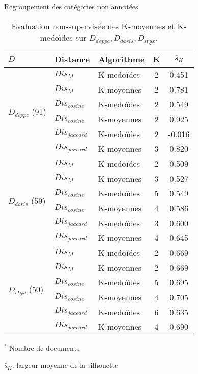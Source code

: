 \begin{frame}[c]{Regroupement des catégories non annotées}
	\newlength{\mrcell}
	\setlength{\mrcell}{0.8cm}
	\begin{table}[!htb]
		\tiny
		\begin{center}						
				\begin{tabular}[pos]{|l|l|l|c|c|}
					\hline
					${D}$& {Distance} & {Algorithme}& {K}  & $\bar{s}_K$ \\ \hline
					\multirow{6}{\mrcell}{${D}_{dcppc}$ (91)} & $Dis_{M}$ & K-medoïdes & 2 & 0.451  \\ \cline{2-5}
					& $Dis_{M}$  & K-moyennes & 2 & 0.781  \\ \cline{2-5}
					& $Dis_{cosine}$ & K-medoïdes & 2 & 0.549 \\ \cline{2-5}
					& $Dis_{cosine}$ & K-moyennes & 2 & 0.925 \\ \cline{2-5}
					& $Dis_{jaccard}$ & K-medoïdes & 2 & -0.016  \\ \cline{2-5}
					& $Dis_{jaccard}$ & K-moyennes & 3 & 0.820 \\ \hline
					\multirow{6}{\mrcell}{${D}_{doris}$ (59)}  & $Dis_{M}$ & K-medoïdes & 2 & 0.509  \\ \cline{2-5}
					& $Dis_{M}$ & K-moyennes & 3 & 0.527  \\ \cline{2-5}
					& $Dis_{cosine}$ & K-medoïdes & 5 & 0.549 \\ \cline{2-5}
					& $Dis_{cosine}$ & K-moyennes & 4 & 0.586 \\ \cline{2-5}
					& $Dis_{jaccard}$ & K-medoïdes & 3 & 0.600 \\ \cline{2-5}
					& $Dis_{jaccard}$ & K-moyennes & 4 & 0.645 
					\\ \hline
					\multirow{6}{\mrcell}{${D}_{styx}$ (50)}  & $Dis_{M}$ & K-medoïdes & 2 & 0.669 \\ \cline{2-5}
					& $Dis_{M}$ & K-moyennes & 2 & 0.669 \\ \cline{2-5}
					& $Dis_{cosine}$ & K-medoïdes & 5 & 0.695 \\ \cline{2-5}
					& $Dis_{cosine}$ & K-moyennes & 4 & 0.705 \\ \cline{2-5}
					& $Dis_{jaccard}$ & K-medoïdes & 6 & 0.635 \\ \cline{2-5}
					& $Dis_{jaccard}$  & K-moyennes & 4 & 0.690 \\ \hline
				\end{tabular}
		\end{center}
		
		$^*$ Nombre de documents
		
		$\bar{s}_K$: largeur moyenne de la silhouette
		
		\caption{\scriptsize Evaluation non-supervisée des K-moyennes et K-medoïdes sur ${D}_{dcppc}, {D}_{doris}, {D}_{styx}$.} \label{tab:similarite:validation-nonsupervisee}
	\end{table}
\end{frame}

